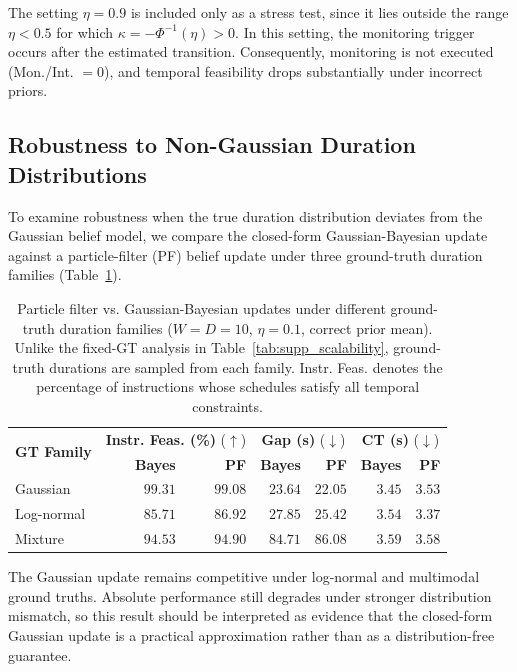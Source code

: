 \documentclass[letterpaper,10pt,onecolumn]{IEEEtran}
\begin{document}
The setting \(\eta=0.9\) is included only as a stress test, since it lies outside the range \(\eta<0.5\) for which \(\kappa=-\Phi^{-1}(\eta)>0\). In this setting, the monitoring trigger occurs after the estimated transition. Consequently, monitoring is not executed (Mon./Int. \(=0\)), and temporal feasibility drops substantially under incorrect priors.


\subsection{Robustness to Non-Gaussian Duration Distributions}\label{supp:pf}
To examine robustness when the true duration distribution deviates from the
Gaussian belief model, we compare the closed-form Gaussian-Bayesian update
against a particle-filter (PF) belief update under three ground-truth duration
families (Table~\ref{tab:supp_pf}).
\begin{table}[H]
\centering
\caption{Particle filter vs. Gaussian-Bayesian updates under different
ground-truth duration families ($W{=}D{=}10$, $\eta{=}0.1$, correct prior
mean). Unlike the fixed-GT analysis in Table~\ref{tab:supp_scalability},
ground-truth durations are sampled from each family. Instr. Feas. denotes the
percentage of instructions whose schedules satisfy all temporal constraints.}
\label{tab:supp_pf}
{\small
\setlength{\tabcolsep}{4.0pt}
\begin{tabular}{@{}l|rr|rr|rr@{}}
\toprule
\multirow{2}{*}{\textbf{GT Family}} &
\multicolumn{2}{c|}{\textbf{Instr. Feas. (\%)} ($\uparrow$)} &
\multicolumn{2}{c|}{\textbf{Gap (s)} ($\downarrow$)} &
\multicolumn{2}{c}{\textbf{CT (s)} ($\downarrow$)} \\
& \textbf{Bayes} & \textbf{PF} & \textbf{Bayes} & \textbf{PF} & \textbf{Bayes} & \textbf{PF} \\
\midrule
Gaussian & $99.31$ & $99.08$ & $23.64$ & $22.05$ & $3.45$ & $3.53$ \\
Log-normal & $85.71$ & $86.92$ & $27.85$ & $25.42$ & $3.54$ & $3.37$ \\
Mixture & $94.53$ & $94.90$ & $84.71$ & $86.08$ & $3.59$ & $3.58$ \\
\bottomrule
\end{tabular}
}
\end{table}
The Gaussian update remains competitive under log-normal and multimodal
ground truths. Absolute performance still degrades under stronger
distribution mismatch, so this result should be interpreted as evidence that
the closed-form Gaussian update is a practical approximation rather than as a
distribution-free guarantee.
\end{document}
